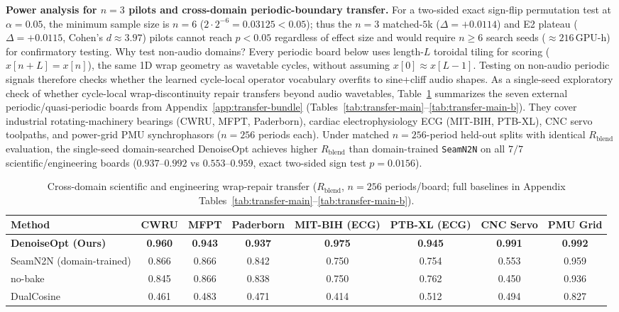 \textbf{Power analysis for $n{=}3$ pilots and cross-domain periodic-boundary transfer.}
For a two-sided exact sign-flip permutation test at $\alpha{=}0.05$, the minimum sample size is $n{=}6$ ($2\cdot 2^{-6}{=}0.03125<0.05$); thus the $n{=}3$ matched-$5$k ($\Delta{=}{+}0.0114$) and E2 plateau ($\Delta{=}{+}0.0115$, Cohen's $d{\approx}3.97$) pilots cannot reach $p{<}0.05$ regardless of effect size and would require $n{\ge}6$ search seeds (${\approx}216$\,GPU-h) for confirmatory testing.
Why test non-audio domains? Every periodic board below uses length-$L$ toroidal tiling for scoring ($x[n{+}L]{=}x[n]$), the same 1D wrap geometry as wavetable cycles, without assuming $x[0]{\approx}x[L{-}1]$. Testing on non-audio periodic signals therefore checks whether the learned cycle-local operator vocabulary overfits to sine+cliff audio shapes.
As a single-seed exploratory check of whether cycle-local wrap-discontinuity repair transfers beyond audio wavetables, Table~\ref{tab:transfer-summary-main} summarizes the seven external periodic/quasi-periodic boards from Appendix~\ref{app:transfer-bundle} (Tables~\ref{tab:transfer-main}--\ref{tab:transfer-main-b}). They cover industrial rotating-machinery bearings (CWRU, MFPT, Paderborn), cardiac electrophysiology ECG (MIT-BIH, PTB-XL), CNC servo toolpaths, and power-grid PMU synchrophasors ($n{=}256$ periods each). Under matched $n{=}256$-period held-out splits with identical $R_{\mathrm{blend}}$ evaluation, the single-seed domain-searched DenoiseOpt achieves higher $R_{\mathrm{blend}}$ than domain-trained \texttt{SeamN2N} on all $7/7$ scientific/engineering boards ($0.937$--$0.992$ vs $0.553$--$0.959$, exact two-sided sign test $p{=}0.0156$).

\begin{table}[t]
  \centering
  \small
  \caption{Cross-domain scientific and engineering wrap-repair transfer ($R_{\mathrm{blend}}$, $n{=}256$ periods/board; full baselines in Appendix Tables~\ref{tab:transfer-main}--\ref{tab:transfer-main-b}).}
  \label{tab:transfer-summary-main}
  \setlength{\tabcolsep}{5pt}
  \begin{tabular}{@{}lccccccc@{}}
    \toprule
    Method & CWRU & MFPT & Paderborn & MIT-BIH (ECG) & PTB-XL (ECG) & CNC Servo & PMU Grid \\
    \midrule
    \textbf{DenoiseOpt (Ours)} & \textbf{0.960} & \textbf{0.943} & \textbf{0.937} & \textbf{0.975} & \textbf{0.945} & \textbf{0.991} & \textbf{0.992} \\
    SeamN2N (domain-trained) & 0.866 & 0.866 & 0.842 & 0.750 & 0.754 & 0.553 & 0.959 \\
    no-bake & 0.845 & 0.866 & 0.838 & 0.750 & 0.762 & 0.450 & 0.936 \\
    DualCosine & 0.461 & 0.483 & 0.471 & 0.414 & 0.512 & 0.494 & 0.827 \\
    \bottomrule
  \end{tabular}
\end{table}



